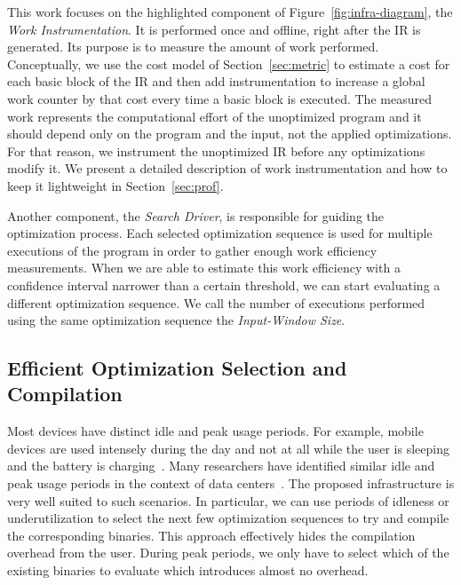 This work focuses on the highlighted component of Figure~\ref{fig:infra-diagram}, the \textit{Work Instrumentation}. It is performed once
and offline, right after the IR is generated. Its purpose is to measure the amount of work performed. Conceptually, we use the cost model of
Section~\ref{sec:metric} to estimate a cost for each basic block of the IR and then add instrumentation to increase a global work counter
by that cost every time a basic block is executed. The measured work represents the computational effort of the unoptimized program and it
should depend only on the program and the input, not the applied optimizations. For that reason, we instrument the unoptimized IR before any optimizations modify it. We present a detailed description of work
instrumentation and how to keep it lightweight in Section~\ref{sec:prof}.

Another component, the \textit{Search Driver}, is responsible for guiding the optimization process. Each selected optimization sequence
is used for multiple executions of the program in order to gather enough work efficiency measurements. When we are able to
estimate this work efficiency with a confidence interval narrower than a certain threshold, we can start evaluating a different
optimization sequence. We call the number of executions performed using the same optimization sequence the \textit{Input-Window Size}.

\subsection{Efficient Optimization Selection and Compilation}

Most devices have distinct idle and peak usage periods. For example, mobile devices are used intensely during the day and not at all while
the user is sleeping and the battery is charging~\citep{mpeis16}. Many researchers have identified similar idle and peak usage periods in
the context of data centers~\citep{armbrust10,chen12b}. The proposed \itercomp infrastructure is very well suited to such scenarios. In
particular, we can use periods of idleness or underutilization to select the next few optimization sequences to try and compile the
corresponding binaries. This approach effectively hides the compilation overhead from the user. During peak periods, we only have to select
which of the existing binaries to evaluate which introduces almost no overhead.
